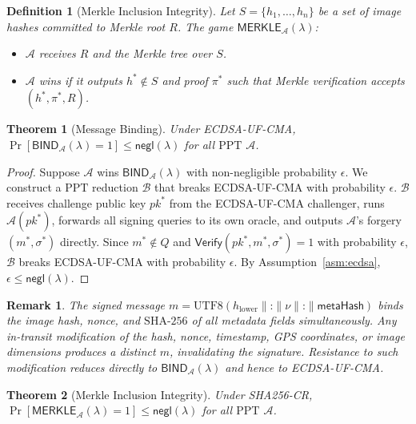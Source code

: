 \documentclass[11pt,a4paper]{article}
\newtheorem{theorem}{Theorem}
\newtheorem{definition}{Definition}
\newtheorem{remark}{Remark}
\newcommand{\negl}{\mathsf{negl}}
\newcommand{\Verify}{\mathsf{Verify}}
\newcommand{\ppt}{\mathrm{PPT}}
\newcommand{\BIND}{\mathsf{BIND}}
\newcommand{\MERKLE}{\mathsf{MERKLE}}
\newcommand{\calA}{\mathcal{A}}
\newcommand{\calB}{\mathcal{B}}
\newcommand{\SHA}{\text{SHA-256}}
\begin{document}
\begin{definition}[Merkle Inclusion Integrity]
\label{def:merkle}
Let $S = \{h_1, \ldots, h_n\}$ be a set of image hashes committed to Merkle
root $R$.  The game $\MERKLE_\calA(\lambda)$:
\begin{itemize}
  \item $\calA$ receives $R$ and the Merkle tree over $S$.
  \item $\calA$ wins if it outputs $h^* \notin S$ and proof $\pi^*$ such that
    Merkle verification accepts $(h^*, \pi^*, R)$.
\end{itemize}
\end{definition}

\begin{theorem}[Message Binding]
\label{thm:binding}
Under \textup{ECDSA-UF-CMA},
$\Pr[\BIND_\calA(\lambda) = 1] \leq \negl(\lambda)$ for all $\ppt$ $\calA$.
\end{theorem}

\begin{proof}
Suppose $\calA$ wins $\BIND_\calA(\lambda)$ with non-negligible probability
$\epsilon$.  We construct a $\ppt$ reduction $\calB$ that breaks ECDSA-UF-CMA
with probability $\epsilon$.  $\calB$ receives challenge public key $pk^*$ from
the ECDSA-UF-CMA challenger, runs $\calA(pk^*)$, forwards all signing queries
to its own oracle, and outputs $\calA$'s forgery $(m^*, \sigma^*)$ directly.
Since $m^* \notin Q$ and $\Verify(pk^*, m^*, \sigma^*) = 1$ with probability
$\epsilon$, $\calB$ breaks ECDSA-UF-CMA with probability $\epsilon$.  By
Assumption~\ref{asm:ecdsa}, $\epsilon \leq \negl(\lambda)$.
\end{proof}

\begin{remark}
\label{rem:binding}
The signed message $m = \mathrm{UTF8}(h_{\mathrm{lower}} \mathbin\| \texttt{:}
\mathbin\| \nu \mathbin\| \texttt{:} \mathbin\| \mathsf{metaHash})$ binds the
image hash, nonce, and $\SHA$ of all metadata fields simultaneously.  Any
in-transit modification of the hash, nonce, timestamp, GPS coordinates, or image
dimensions produces a distinct $m$, invalidating the signature.  Resistance to
such modification reduces directly to $\BIND_\calA(\lambda)$ and hence to
ECDSA-UF-CMA.
\end{remark}

\begin{theorem}[Merkle Inclusion Integrity]
\label{thm:merkle}
Under \textup{SHA256-CR},
$\Pr[\MERKLE_\calA(\lambda) = 1] \leq \negl(\lambda)$ for all $\ppt$ $\calA$.
\end{theorem}
\end{document}
